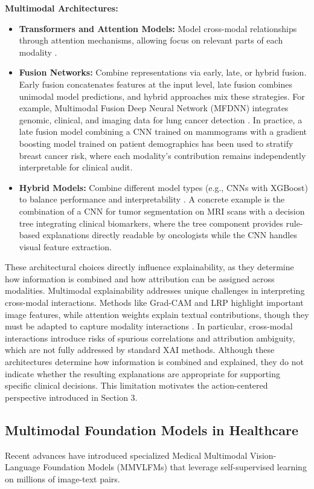 \documentclass[pdflatex,sn-mathphys-num]{sn-jnl}%
\theoremstyle{thmstyleone}%
\theoremstyle{thmstyletwo}%
\theoremstyle{thmstylethree}%
\begin{document}
\textbf{Multimodal Architectures:}
\begin{itemize}
    \item \textbf{Transformers and Attention Models:} Model cross-modal relationships through attention mechanisms, allowing focus on relevant parts of each modality \cite{rodis2024multimodalexplainableartificialintelligence,HOFMANN2022119504}.
    \item \textbf{Fusion Networks:} Combine representations via early, late, or hybrid fusion. Early fusion concatenates features at the input level, late fusion combines unimodal model predictions, and hybrid approaches mix these strategies. For example, Multimodal Fusion Deep Neural Network (MFDNN) integrates genomic, clinical, and imaging data for lung cancer detection \cite{wani2024deepxplainer}.
    In practice, a late fusion model combining a CNN trained on mammograms with a gradient boosting model trained on patient demographics has been used to stratify breast cancer risk, where each modality's contribution remains independently interpretable for clinical audit.
    \item \textbf{Hybrid Models:} Combine different model types (e.g., CNNs with XGBoost) to balance performance and interpretability \cite{wani2024deepxplainer}.
    A concrete example is the combination of a CNN for tumor segmentation on MRI scans with a decision tree integrating clinical biomarkers, where the tree component provides rule-based explanations directly readable by oncologists while the CNN handles visual feature extraction.
\end{itemize}
These architectural choices directly influence explainability, as they determine how information is combined and how attribution can be assigned across modalities.
Multimodal explainability addresses unique challenges in interpreting cross-modal interactions. Methods like Grad-CAM and LRP highlight important image features, while attention weights explain textual contributions, though they must be adapted to capture modality interactions \cite{HOFMANN2022119504,rodis2024multimodalexplainableartificialintelligence}.
In particular, cross-modal interactions introduce risks of spurious correlations and attribution ambiguity, which are not fully addressed by standard XAI methods.
Although these architectures determine how information is combined and explained, they do not indicate whether the resulting explanations are appropriate for supporting specific clinical decisions. This limitation motivates the action-centered perspective introduced in Section 3.
\subsection{Multimodal Foundation Models in Healthcare}
Recent advances have introduced specialized Medical Multimodal Vision-Language Foundation Models (MMVLFMs) that leverage self-supervised learning on millions of image-text pairs.
\end{document}
